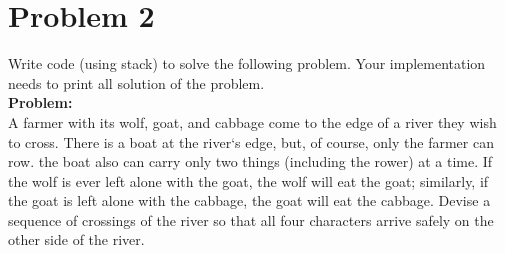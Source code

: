 \documentclass[UTF8]{ctexart}
\begin{document}
\section*{Problem 2}
Write code (using stack) to solve the following problem. Your implementation needs to print all solution of the problem.\\
\textbf{\large Problem:}\\
A farmer with its wolf, goat, and cabbage come to the edge of a river they wish to cross.
There is a boat at the river`s edge, but, of course, only the farmer can row. the boat also can carry only two things (including the rower) at a time. 
If the wolf is ever left alone with the goat, the wolf will eat the goat;
similarly, if the goat is left alone with the cabbage, the goat will eat the cabbage.
Devise a sequence of crossings of the river so that all four characters arrive safely on the other side of the river.
\end{document}
